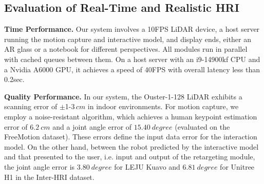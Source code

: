 \subsection{Evaluation of Real-Time and Realistic HRI}
\label{eval2}

\noindent\textbf{Time Performance.} Our system involves a 10FPS LiDAR device, a host server running the motion capture and interactive model, and display ends, either an AR glass or a notebook for different perspectives.
All modules run in parallel with cached queues between them.
On a host server with an i9-14900kf CPU and a Nvidia A6000 GPU, it achieves a speed of 40FPS with overall latency less than 0.2sec.

\noindent\textbf{Quality Performance.} %
In our system, the Ouster-1-128 LiDAR exhibits a scanning error of $\pm$1-3$\,cm$ in indoor environments. For motion capture, we employ a noise-resistant algorithm, which achieves a human keypoint estimation error of $6.2~cm$ and a joint angle error of $15.40~degree$ (evaluated on the FreeMotion %
dataset). These errors define the input data error for the interaction model. On the other hand, %
between the robot predicted by the interactive model and that presented to the user, i.e. input and output of the retargeting module, the joint angle error is $3.80~degree$ for LEJU Kuavo and $6.81~degree$ for Unitree H1 in the Inter-HRI dataset.
\color{black}

